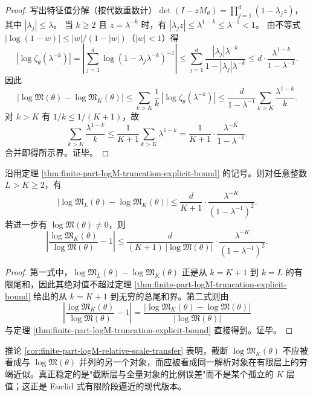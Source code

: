 \begin{proof}
写出特征值分解（按代数重数计）\(\det(I-zM_\theta)=\prod_{j=1}^{d}(1-\lambda_j z)\)，其中 \(|\lambda_j|\le\lambda\)。
当 \(k\ge 2\) 且 \(z=\lambda^{-k}\) 时，有 \(|\lambda_j z|\le \lambda^{1-k}\le\lambda^{-1}<1\)。
由不等式 \(|\log(1-w)|\le |w|/(1-|w|)\)（\(|w|<1\)）得
\[
|\log \zeta_\theta(\lambda^{-k})|
=\left|\sum_{j=1}^{d}\log(1-\lambda_j\lambda^{-k})^{-1}\right|
\le \sum_{j=1}^{d}\frac{|\lambda_j|\lambda^{-k}}{1-|\lambda_j|\lambda^{-k}}
\le d\cdot \frac{\lambda^{1-k}}{1-\lambda^{-1}}.
\]
因此
\[
\bigl|\log\mathfrak{M}(\theta)-\log\mathfrak{M}_K(\theta)\bigr|
\le
\sum_{k>K}\frac{1}{k}\,|\log \zeta_\theta(\lambda^{-k})|
\le
\frac{d}{1-\lambda^{-1}}\sum_{k>K}\frac{\lambda^{1-k}}{k}.
\]
对 \(k>K\) 有 \(1/k\le 1/(K+1)\)，故
\[
\sum_{k>K}\frac{\lambda^{1-k}}{k}
\le
\frac{1}{K+1}\sum_{k>K}\lambda^{1-k}
=
\frac{1}{K+1}\cdot\frac{\lambda^{-K}}{1-\lambda^{-1}}.
\]
合并即得所示界。证毕。
\end{proof}

\begin{corollary}[截断层间的比例传递与穷竭误差]\label{cor:finite-part-logM-relative-scale-transfer}
沿用定理 \ref{thm:finite-part-logM-truncation-explicit-bound} 的记号。则对任意整数 \(L>K\ge 2\)，有
\[
\bigl|\log\mathfrak{M}_L(\theta)-\log\mathfrak{M}_K(\theta)\bigr|
\le
\frac{d}{K+1}\cdot\frac{\lambda^{-K}}{(1-\lambda^{-1})^2}.
\]
若进一步有 \(\log\mathfrak{M}(\theta)\neq 0\)，则
\[
\left|
\frac{\log\mathfrak{M}_K(\theta)}{\log\mathfrak{M}(\theta)}-1
\right|
\le
\frac{d}{(K+1)\,|\log\mathfrak{M}(\theta)|}\cdot\frac{\lambda^{-K}}{(1-\lambda^{-1})^2}.
\]
\end{corollary}

\begin{proof}
第一式中，\(\log\mathfrak{M}_L(\theta)-\log\mathfrak{M}_K(\theta)\) 正是从 \(k=K+1\) 到 \(k=L\) 的有限尾和，因此其绝对值不超过定理 \ref{thm:finite-part-logM-truncation-explicit-bound} 给出的从 \(k=K+1\) 到无穷的总尾和界。第二式则由
\[
\left|
\frac{\log\mathfrak{M}_K(\theta)}{\log\mathfrak{M}(\theta)}-1
\right|
=
\frac{\bigl|\log\mathfrak{M}_K(\theta)-\log\mathfrak{M}(\theta)\bigr|}{|\log\mathfrak{M}(\theta)|}
\]
与定理 \ref{thm:finite-part-logM-truncation-explicit-bound} 直接得到。证毕。
\end{proof}

\begin{remark}[穷竭法式比例读法]\label{rem:finite-part-logM-exhaustion-ratio-reading}
推论 \ref{cor:finite-part-logM-relative-scale-transfer} 表明，截断 \(\log\mathfrak{M}_K(\theta)\) 不应被看成与 \(\log\mathfrak{M}(\theta)\) 并列的另一个对象，而应被看成同一解析对象在有限层上的穷竭近似。真正稳定的是"截断层与全量对象的比例误差"而不是某个孤立的 \(K\) 层值；这正是 Euclid 式有限阶段逼近的现代版本。
\end{remark}

